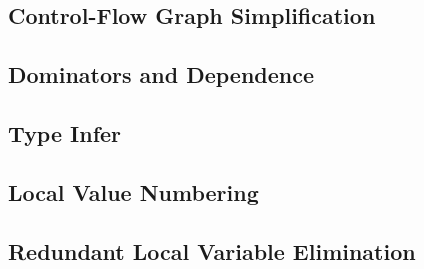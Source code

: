 \subsection{Control-Flow Graph Simplification}

\subsection{Dominators and Dependence}

\subsection{Type Infer}

\subsection{Local Value Numbering}

\subsection{Redundant Local Variable Elimination}